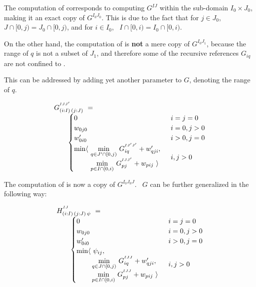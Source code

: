 The computation of  corresponds to computing $G^{IJ}$ within the sub-domain 
$I_0\times J_0$, making it an exact copy of $G^{I_0J_0}$. This is due to the fact
that for $j\in J_0$, ~$J\cap[0,j)=J_0\cap[0,j)$, and for $i\in I_0$, ~$I\cap[0,i)=I_0\cap[0,i)$.

On the other hand, the computation of  is {\bf not} a mere copy of $G^{I_0J_1}$, 
because the range of $q$ is not a subset of $J_1$, and therefore 
some of the recursive references $G_{iq}$ are not confined to .


This can be addressed by adding yet another parameter to $G$, denoting the range of $q$.

\begin{equation}\LeftEqNo
\begin{array}{l@{}l}
	G^{^{IJJ'}}_{(i:I)\,(j:J)} ~=~  \\
	\qquad
	\begin{cases}
		0                         & i=j=0 \\
		w_{0j0}                   & i=0, j>0 \\
		w'_{0i0}                  & i>0, j=0 \\
		\begin{array}{@{}l@{~}l}
		  \min\langle & \underset{q\in J'\cap[0,j)}\min ~ G^{^{IJ'J'}}_{iq} + \yw{qji}, \\
		              & \underset{p\in I\cap[0,i)}\min ~ G^{^{IJJ'}}_{pj} + \xw{pij}~\rangle
		\end{array}              & i,j>0
	\end{cases}
\end{array}
\end{equation}

The computation of  is now a copy of $G^{I_0J_0J}$. ~$G$ can be further generalized in the following
way:

\newcommand{\Ggen}{H}

\begin{equation}\LeftEqNo
\begin{array}{l@{}l}
	\Ggen^{^{IJ}}_{(i:I)\,(j:J)\,\psi} ~=~  \\
	\qquad
	\begin{cases}
		0                         & i=j=0 \\
		w_{0j0}                   & i=0, j>0 \\
		w'_{0i0}                  & i>0, j=0 \\
		\begin{array}{@{}l@{~}l}
		  \min\langle & \psi_{ij}, \\
		              & \!\underset{q\in J\cap[0,j)}\min ~ G^{^{IJJ}}_{iq} + \yw{qji}, \\
		              & \!\underset{p\in I\cap[0,i)}\min ~ G^{^{IJJ}}_{pj} + \xw{pij}~\rangle
		\end{array}              & i,j>0
	\end{cases}
\end{array}
\end{equation}

